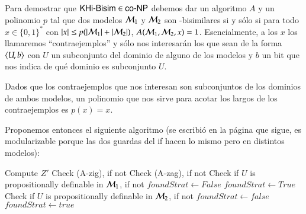 \begin{demostracion}
    Para demostrar que $\rm\textsf{KHi-Bisim} \in \rm\textsf{co-NP}$ debemos dar un algoritmo $A$ y un polinomio $p$ tal que dos modelos 
    $\mathcal{M}_1$ y $\mathcal{M}_2$ son \KHilogic-bisimilares si y sólo si para todo $x \in \{0,1\}^*$ con 
    $|x| \le p(|\mathcal{M}_1|+|\mathcal{M}_2|)$,  $A(\mathcal{M}_1,\mathcal{M}_2,x) = 1$. Esencialmente, a los $x$ los 
    llamaremos ``contraejemplos'' y sólo nos interesarán los que sean de la forma $\langle U,b \rangle$ con $U$ un 
    subconjunto del dominio de alguno de los modelos y $b$ un bit que nos indica de qué dominio es subconjunto $U$. 

    Dados que los contraejemplos que nos interesan son subconjuntos de los dominios de ambos modelos, un polinomio 
    que nos sirve para acotar los largos de los contraejemplos es $p(x) = x$. 

    Proponemos entonces el siguiente algoritmo (se escribió en la página que sigue, es modularizable porque las dos 
    guardas del if hacen lo mismo pero en distintos modelos):

    \begin{algorithm}
        \begin{algorithmic}
            \small
            \State Compute $Z'$
            \State Check (A-zig), if not 
            \State Check (A-zag), if not 
            \State Check if $U$ is propositionally definable in $\mathcal{M}_1$, if not 
                        \State $foundStrat \gets False$
                                    \State $foundStrat \gets True$
                                \EndIf         
                            \EndFor
                            \EndIf
                        \EndIf
                    \EndFor
                \EndFor
            \Else
                \State Check if $U$ is propositionally definable in $\mathcal{M}_2$, if not 
                        \State $foundStrat \gets false$
                                    \State $foundStrat \gets true$
                                \EndIf         
                            \EndFor
                            \EndIf
                        \EndIf
                    \EndFor
                \EndFor
            \EndIf
            \State {}
            \end{algorithmic}
    \end{algorithm}


\end{demostracion}
